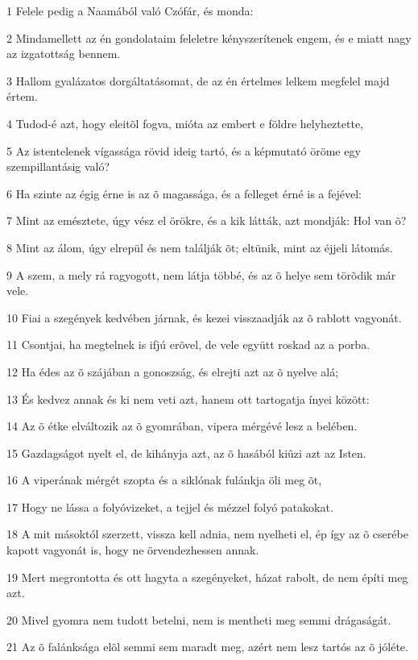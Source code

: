 \par 1 Felele pedig a Naamából való Czófár, és monda:
\par 2 Mindamellett az én gondolataim feleletre kényszerítenek engem, és e miatt nagy az izgatottság bennem.
\par 3 Hallom gyalázatos dorgáltatásomat, de az én értelmes lelkem megfelel majd értem.
\par 4 Tudod-é azt, hogy eleitõl fogva, mióta az embert e földre helyheztette,
\par 5 Az istentelenek vígassága rövid ideig tartó, és a képmutató öröme egy szempillantásig való?
\par 6 Ha szinte az égig érne is az õ magassága, és a felleget érné is a fejével:
\par 7 Mint az emésztete, úgy vész el örökre, és a kik látták, azt mondják: Hol van õ?
\par 8 Mint az álom, úgy elrepül és nem találják õt; eltünik, mint az éjjeli látomás.
\par 9 A szem, a mely rá ragyogott, nem látja többé, és az õ helye sem törõdik már vele.
\par 10 Fiai a szegények kedvében járnak, és kezei visszaadják az õ rablott vagyonát.
\par 11 Csontjai, ha megtelnek is ifjú erõvel, de vele együtt roskad az a porba.
\par 12 Ha édes az õ szájában a gonoszság, és elrejti azt az õ nyelve alá;
\par 13 És kedvez annak és ki nem veti azt, hanem ott tartogatja ínyei között:
\par 14 Az õ étke elváltozik az õ gyomrában, vipera mérgévé lesz a belében.
\par 15 Gazdagságot nyelt el, de kihányja azt, az õ hasából kiûzi azt az Isten.
\par 16 A viperának mérgét szopta és a siklónak fulánkja öli meg õt,
\par 17 Hogy ne lássa a folyóvizeket, a tejjel és mézzel folyó patakokat.
\par 18 A mit másoktól szerzett, vissza kell adnia, nem nyelheti el, ép így az õ cserébe kapott vagyonát is, hogy ne örvendezhessen annak.
\par 19 Mert megrontotta és ott hagyta a szegényeket, házat rabolt, de nem építi meg azt.
\par 20 Mivel gyomra nem tudott betelni, nem is mentheti meg semmi drágaságát.
\par 21 Az õ falánksága elõl semmi sem maradt meg, azért nem lesz tartós az õ jóléte.
